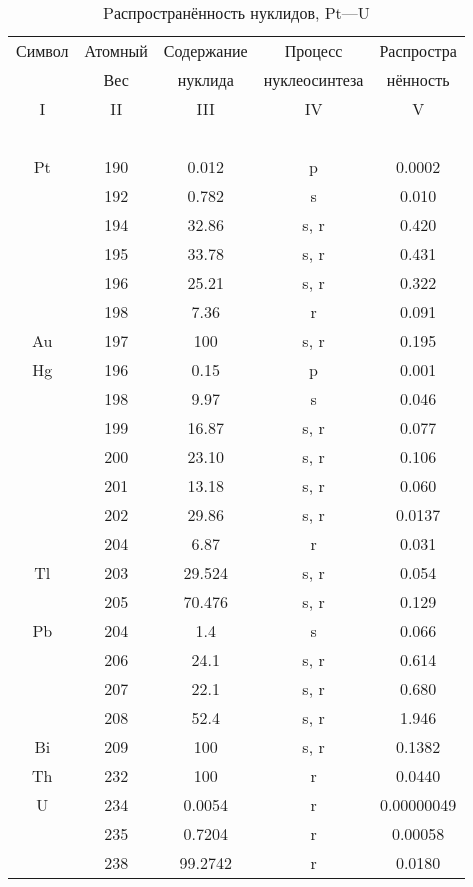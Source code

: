 \documentclass[a5paper,openany]{book}
\begin{document}
\begin{table}[h!]
	{\small
		\begin{tabular}{ccccc}
			Символ  & Атомный &  Содержание  & Процесс & Распростра   \\
			~ & Вес &  нуклида  &  нуклеосинтеза  & нённость  \\
			\hline 
			I & II &  III  & IV & V \\
			\hline 
			~ & ~ & ~ & ~ & ~  \\
			Pt & 190 & 0.012 & p & 0.0002 \\ [1mm] 
			& 192 &  0.782 & s & 0.010 \\ [1mm]  			
			& 194 & 32.86 & s, r & 0.420 \\ [1mm]	
			& 195 &  33.78 & s, r & 0.431 \\ [1mm]  	
			& 196 &  25.21 & s, r & 0.322 \\ [1mm] 
			& 198 &  7.36 & r & 0.091 \\ [1mm]  
			Au  & 197 & 100 & s, r & 0.195 \\ [1mm]
			Hg & 196 & 0.15 & p & 0.001 \\ [1mm] 
			& 198 &  9.97 & s & 0.046 \\ [1mm]  			
			& 199 & 16.87 & s, r & 0.077 \\ [1mm]	
			& 200 &  23.10 & s, r & 0.106 \\ [1mm]  	
			& 201 &  13.18 & s, r & 0.060 \\ [1mm] 
			& 202 &  29.86 & s, r & 0.0137 \\ [1mm] 
			& 204 &  6.87 & r & 0.031 \\ [1mm]
			Tl & 203 & 29.524 & s, r & 0.054 \\ [1mm] 
			& 205 &  70.476 & s, r & 0.129 \\ [1mm] 
			Pb & 204 & 1.4 & s &  0.066 \\ [1mm]
			& 206 & 24.1 & s, r & 0.614 \\ [1mm] 			
			& 207 & 22.1 & s, r & 0.680 \\ [1mm] 				
			& 208 & 52.4 & s, r & 1.946 \\ [1mm] 	
			Bi & 209 & 100 &  s, r &  0.1382 \\ [1mm]
			\hline
			Th & 232 & 100 &  r &  0.0440 \\ [1mm]	
			U & 234 & 0.0054 &  r &  0.00000049 \\ [1mm]
			& 235 & 0.7204 &  r &  0.00058 \\ [1mm]	
			& 238 & 99.2742 &  r &  0.0180\\ [1mm]		
			\hline 
		\end{tabular}
	}
	\caption{Pаспространённость нуклидов, Pt---U}
	\label{t:AbudanceSolarPt-U}
\end{table}
\end{document}
